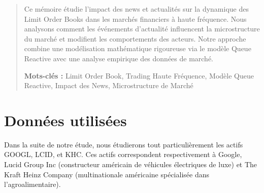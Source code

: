 \documentclass[12pt,a4paper]{article}
\theoremstyle{definition}
\theoremstyle{remark}
\begin{document}
    \begin{abstract}
    \thispagestyle{empty}
    \vspace*{1cm}
    \begin{center}

    \end{center}
    \vspace{1cm}

    Ce mémoire étudie l'impact des news et actualités sur la dynamique des Limit Order Books dans les marchés financiers à haute fréquence. Nous analysons comment les événements d'actualité influencent la microstructure du marché et modifient les comportements des acteurs. Notre approche combine une modélisation mathématique rigoureuse via le modèle Queue Reactive avec une analyse empirique des données de marché.

    \vspace{1cm}
    \textbf{Mots-clés :} Limit Order Book, Trading Haute Fréquence, Modèle Queue Reactive, Impact des News, Microstructure de Marché

\end{abstract}
    \newpage
    \tableofcontents
    \thispagestyle{empty}

    \newpage
    \setcounter{page}{1}
    
    
\section{Données utilisées}
Dans la suite de notre étude, nous étudierons tout particulièrement les actifs GOOGL, LCID, et KHC. Ces actifs correspondent respectivement à Google, Lucid Group Inc (constructeur américain de véhicules électriques de luxe) et The Kraft Heinz Company (multinationale américaine spécialisée dans l'agroalimentaire).
\end{document}
